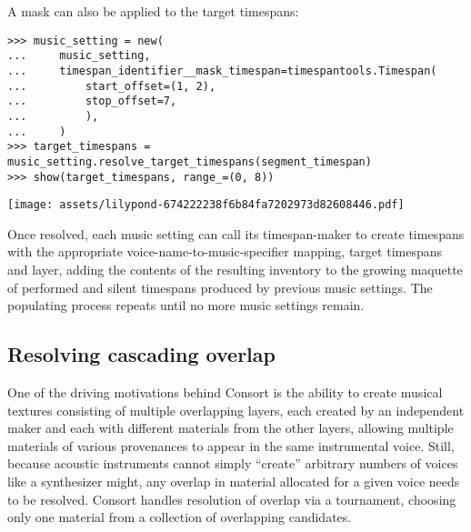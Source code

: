\noindent A mask can also be applied to the target timespans:

\begin{comment}
<abjad>
music_setting = new(
    music_setting,
    timespan_identifier__mask_timespan=timespantools.Timespan(
        start_offset=(1, 2),
        stop_offset=7,
        ),
    )
target_timespans = music_setting.resolve_target_timespans(segment_timespan)
show(target_timespans, range_=(0, 8))
</abjad>
\end{comment}

\begin{abjadbookoutput}
\begin{singlespacing}
\vspace{-0.5\baselineskip}
\begin{verbatim}
>>> music_setting = new(
...     music_setting,
...     timespan_identifier__mask_timespan=timespantools.Timespan(
...         start_offset=(1, 2),
...         stop_offset=7,
...         ),
...     )
>>> target_timespans = music_setting.resolve_target_timespans(segment_timespan)
>>> show(target_timespans, range_=(0, 8))
\end{verbatim}
\noindent\texttt{[image: assets/lilypond-674222238f6b84fa7202973d82608446.pdf]}
\end{singlespacing}
\end{abjadbookoutput}

\noindent Once resolved, each music setting can call its timespan-maker to
create timespans with the appropriate voice-name-to-music-specifier mapping,
target timespans and layer, adding the contents of the resulting inventory to
the growing maquette of performed and silent timespans produced by previous
music settings. The populating process repeats until no more music settings
remain.

\subsection{Resolving cascading overlap}
\label{ssec:resolving-cascading-overlap}

One of the driving motivations behind Consort is the ability to create musical
textures consisting of multiple overlapping layers, each created by an
independent maker and each with different materials from the other layers,
allowing multiple materials of various provenances to appear in the same
instrumental voice. Still, because acoustic instruments cannot simply
\enquote{create} arbitrary numbers of voices like a synthesizer might, any
overlap in material allocated for a given voice needs to be resolved. Consort
handles resolution of overlap via a tournament, choosing only one material from
a collection of overlapping candidates.

